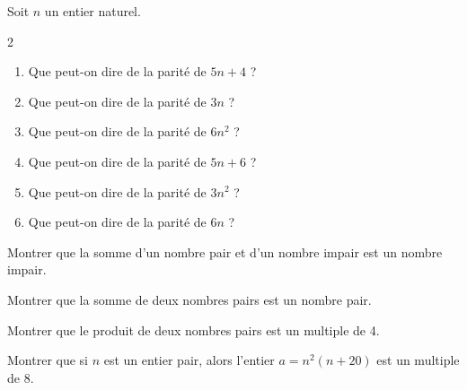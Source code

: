 {%
\begin{Exercice}
Soit $n$ un entier naturel.
\vspace{-0.5cm}
\begin{multicols}{2}
\begin{enumerate}[itemsep=1em]
	\item \begin{minipage}[t]{\linewidth}Que peut-on dire de la parité de $5n+4$ ?\end{minipage}
	\item \begin{minipage}[t]{\linewidth}Que peut-on dire de la parité de 3$n$ ?\end{minipage}
	\item \begin{minipage}[t]{\linewidth}Que peut-on dire de la parité de $6n^{2}$ ?\end{minipage}
	\item \begin{minipage}[t]{\linewidth}Que peut-on dire de la parité de $5n+6$ ?\end{minipage}
	\item \begin{minipage}[t]{\linewidth}Que peut-on dire de la parité de $3n^{2}$ ?\end{minipage}
	\item \begin{minipage}[t]{\linewidth}Que peut-on dire de la parité de 6$n$ ?\end{minipage}
\end{enumerate}
\end{multicols}
\end{Exercice}


\begin{Exercice}
Montrer que la somme d'un nombre pair et d'un nombre impair est un nombre impair.
\end{Exercice}

\begin{Exercice}
Montrer que la somme de deux nombres pairs est un nombre pair.
\end{Exercice}

\begin{Exercice}
Montrer que le produit de deux nombres pairs est un multiple de 4.
\end{Exercice}

\begin{Exercice}
Montrer que si $ n $ est un entier pair, alors l'entier $  a =n^2 (n + 20) $ est un multiple de 8.
\end{Exercice}



}
